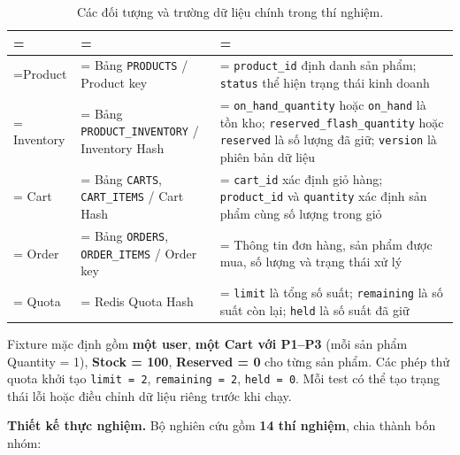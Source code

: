\begin{table}[H]
\centering
\caption{Các đối tượng và trường dữ liệu chính trong thí nghiệm.}\label{tab:tx-1}
\reporttablesetup
\footnotesize
\begin{tabularx}{\linewidth}{|>{\hsize\linewidth=\hsize}L|>{\hsize\linewidth=\hsize}L|>{\hsize\linewidth=\hsize}L|}
\hline
{}
 &  &  \\ \hline
Product & Bảng \texttt{PRODUCTS} / Product key & \texttt{product\_\allowbreak{}id} định danh sản phẩm; \texttt{status} thể hiện trạng thái kinh doanh \\ \hline
Inventory & Bảng \texttt{PRODUCT\_\allowbreak{}INVENTORY} / Inventory Hash & \texttt{on\_\allowbreak{}hand\_\allowbreak{}quantity} hoặc \texttt{on\_\allowbreak{}hand} là tồn kho; \texttt{reserved\_\allowbreak{}flash\_\allowbreak{}quantity} hoặc \texttt{reserved} là số lượng đã giữ; \texttt{version} là phiên bản dữ liệu \\ \hline
Cart & Bảng \texttt{CARTS}, \texttt{CART\_\allowbreak{}ITEMS} / Cart Hash & \texttt{cart\_\allowbreak{}id} xác định giỏ hàng; \texttt{product\_\allowbreak{}id} và \texttt{quantity} xác định sản phẩm cùng số lượng trong giỏ \\ \hline
Order & Bảng \texttt{ORDERS}, \texttt{ORDER\_\allowbreak{}ITEMS} / Order key & Thông tin đơn hàng, sản phẩm được mua, số lượng và trạng thái xử lý \\ \hline
Quota & Redis Quota Hash & \texttt{limit} là tổng số suất; \texttt{remaining} là số suất còn lại; \texttt{held} là số suất đã giữ \\ \hline
\end{tabularx}
\end{table}
Fixture mặc định gồm \textbf{một user}, \textbf{một Cart với P1–P3} (mỗi sản phẩm Quantity = 1), \textbf{Stock = 100}, \textbf{Reserved = 0} cho từng sản phẩm. Các phép thử quota khởi tạo \texttt{limit =\allowbreak{} 2}, \texttt{remaining =\allowbreak{} 2}, \texttt{held =\allowbreak{} 0}. Mỗi test có thể tạo trạng thái lỗi hoặc điều chỉnh dữ liệu riêng trước khi chạy.

\textbf{Thiết kế thực nghiệm.} Bộ nghiên cứu gồm \textbf{14 thí nghiệm}, chia thành bốn nhóm:

